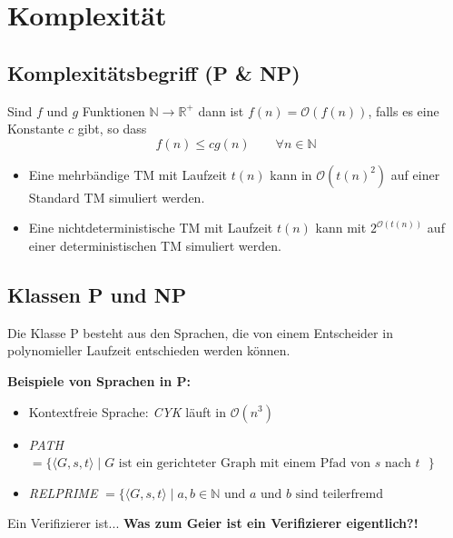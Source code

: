 \documentclass[a4paper]{article}
\begin{document}
	

\newpage
\section{Komplexität}


\subsection{Komplexitätsbegriff (P \& NP)}
	\begin{fdef}
	Sind $f$ und $g$ Funktionen $\mathbb{N} \rightarrow \mathbb{R}^+$ dann ist $f(n) = \mathcal{O}(f(n))$, falls es eine Konstante $c$ gibt, so dass
	$$f(n) \leq cg(n) \qquad \forall n \in \mathbb{N}$$
	\end{fdef}

	\begin{fmerke}
	\begin{itemize}
		\item Eine mehrbändige TM mit Laufzeit $t(n)$ kann in $\mathcal{O}(t(n)^2)$ auf einer Standard TM simuliert werden.
		\item Eine nichtdeterministische TM mit Laufzeit $t(n)$ kann mit $2^{\mathcal{O}(t(n))}$ auf einer deterministischen TM simuliert werden.
	\end{itemize}
	\end{fmerke}

\subsection{Klassen P und NP}
	\begin{fdef}[Klasse P]
	Die Klasse P besteht aus den Sprachen, die von einem Entscheider in polynomieller Laufzeit entschieden werden können.
	\end{fdef}
	
	\textbf{Beispiele von Sprachen in P:}
	\begin{itemize}
		\item Kontextfreie Sprache: \textit{CYK} läuft in $\mathcal{O}(n^3)$
		\item \textit{PATH} $= \{ \langle G,s,t \rangle \mid \text{$G$ ist ein gerichteter Graph mit einem Pfad von $s$ nach $t$ } \}$
		\item \textit{RELPRIME} $= \{ \langle G,s,t \rangle \mid a,b \in \mathbb{N} \text{ und $a$ und $b$ sind teilerfremd} $
	\end{itemize}

	\begin{fdef}[Verifizierer]
	Ein Verifizierer ist... \textbf{Was zum Geier ist ein Verifizierer eigentlich?!}
	\end{fdef}
\end{document}
